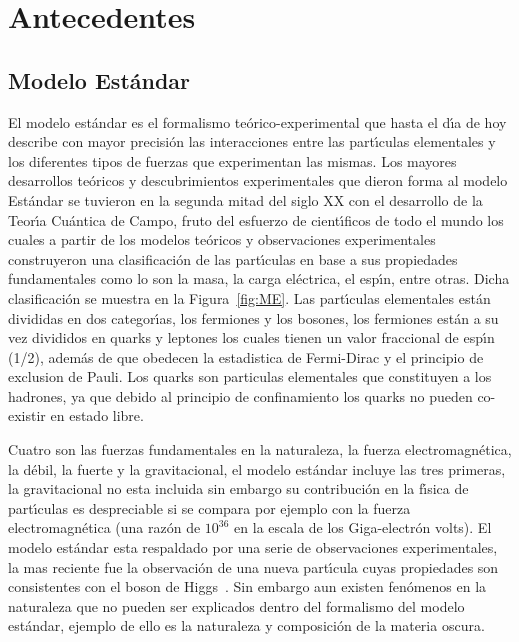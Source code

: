 \chapter{Antecedentes}

\section{Modelo Est\'andar}

El modelo est\'andar es el formalismo te\'orico-experimental que hasta el d\'{\i}a de hoy  describe con mayor precisi\'on las interacciones entre las part\'{\i}culas elementales y los diferentes tipos de fuerzas que experimentan las mismas. Los mayores desarrollos te\'oricos y descubrimientos experimentales que dieron forma al modelo Est\'andar se tuvieron en la segunda mitad del siglo XX con el desarrollo de la Teor\'{\i}a Cu\'antica de Campo, fruto del esfuerzo de cient\'{\i}ficos de todo el mundo los cuales a partir de los modelos te\'oricos y observaciones experimentales construyeron una clasificaci\'on de las part\'{\i}culas en base a sus propiedades fundamentales como lo son la masa, la carga el\'ectrica, el esp\'{\i}n, entre otras. Dicha clasificaci\'on se muestra en la Figura~\ref{fig:ME}. Las part\'{\i}culas elementales est\'an divididas en dos categor\'{\i}as, los fermiones y los bosones, los fermiones est\'an a su vez divididos en quarks y leptones los cuales tienen un valor fraccional de esp\'{\i}n (1/2), adem\'as de que obedecen la estadistica de Fermi-Dirac y el principio de exclusion de Pauli. Los quarks son particulas elementales que constituyen a los hadrones, ya que debido al principio de confinamiento los quarks no pueden co-existir en estado libre.

Cuatro son las fuerzas fundamentales en la naturaleza, la fuerza electromagn\'etica, la d\'ebil, la fuerte y la gravitacional, el modelo est\'andar incluye las tres primeras, la gravitacional no esta incluida sin embargo su contribuci\'on en la f\'{\i}sica de part\'{\i}culas es despreciable si se compara por ejemplo con la fuerza electromagn\'etica (una raz\'on de $10^{36}$ en la escala de los Giga-electr\'on volts). El modelo est\'andar esta respaldado por una serie de observaciones experimentales, la mas reciente fue la observaci\'on de una nueva part\'{\i}cula cuyas propiedades son consistentes con el boson de Higgs~\cite{higgs}. Sin embargo aun existen fen\'omenos en la naturaleza que no pueden ser explicados dentro del formalismo del modelo est\'andar, ejemplo de ello es la naturaleza y composici\'on de la materia oscura.

